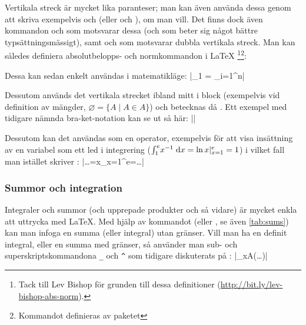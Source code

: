 \documentclass[lang=sv,ptsize=10pt,font=none,nomath,titles=bf,../../a4.tex]{subfiles}
\begin{document}
Vertikala streck är mycket lika paranteser; man kan även använda dessa
genom att skriva exempelvis  och  (eller
 och ), om man
vill. Det
finns dock även kommandon  och  som motsvarar dessa
(och som beter sig något bättre typsättningsmässigt),
samt  och  som motsvarar dubbla vertikala streck.
Man kan således definiera absolutbelopps- och normkommandon i \LaTeX%
\footnote{Tack till Lev Bishop för grunden till dessa definitioner 
(\url{http://bit.ly/lev-bishop-abs-norm}).}\footnote{Kommandot
 definieras av paketet }:
\begin{latexcode}
\DeclarePairedDelimiter\abs{\lvert}{\rvert}
\DeclarePairedDelimiter\norm{\lVert}{\rVert}
\end{latexcode}
\label{cmd:declarepaireddelimiter}
Dessa kan sedan enkelt användas i matematikläge:
\latex|_1 = \sum_{i=1}^n|

Dessutom används det vertikala strecket ibland mitt i block (exempelvis
vid definition av mängder, \(\varnothing = \{A \mid A \in A\}\)) och
betecknas då . Ett exempel med tidigare nämnda bra-ket-notation
kan se ut så här: \label{sec:3:mid}
\latex|\left\langle\psi\mid\Psi\right\rangle|

Dessutom kan det användas som en operator,
exempelvis för att visa insättning av en variabel som ett led i
integrering (\(\int_1^e\! x^{-1}\d{x}=\ln x\vert_{x=1}^e=1 \)) i vilket
fall man istället skriver :
\latex|\ldots=\ln x\vert_{x=1}^e=\ldots|

\subsubsection{Summor och integration}
Integraler och summor (och upprepade produkter och så vidare) är mycket
enkla att uttrycka med \LaTeX{}. Med hjälp av kommandot  (eller
, se även \cref{tab:sums}) kan man infoga en summa (eller
integral) utan gränser. Vill man ha en definit integral, eller en summa
med gränser, så använder man sub- och superskriptskommandona \verb|_| och
\verb|^| som tidigare diskuterats på :
\latex|\sum_{x\in A}\left(\ldots\right)|
\end{document}
